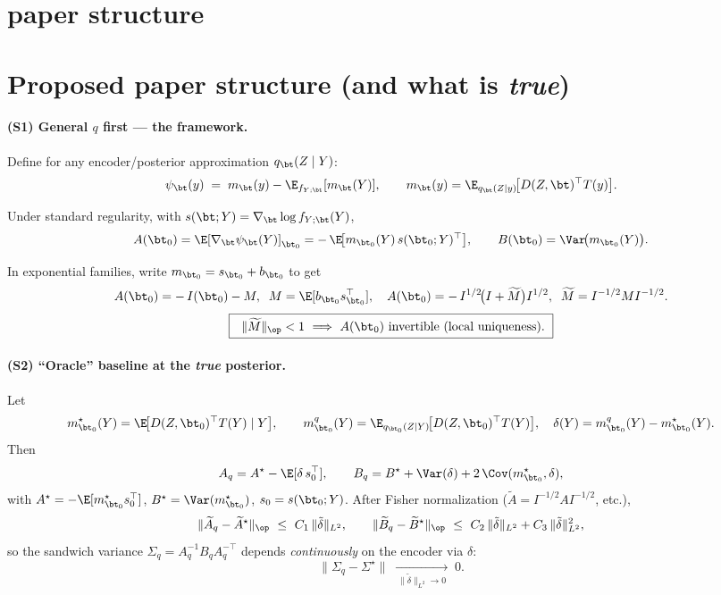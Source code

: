 \section{paper structure}

\section*{Proposed paper structure (and what is \emph{true})}

\paragraph{(S1) General $q$ first — the framework.}
Define for any encoder/posterior approximation $q_\bt(Z\mid Y)$:
\[
\psi_\bt(y)\;=\;m_\bt(y)-\E_{f_{Y;\bt}}[m_\bt(Y)],\qquad
m_\bt(y)=\E_{q_\bt(Z\mid y)}\!\big[D(Z,\bt)^\top T(y)\big].
\]
\begin{lemma}
Under standard regularity, with $s(\bt;Y)=\nabla_\bt\log f_{Y;\bt}(Y)$,
\[
A(\bt_0)=\E[\nabla_\bt\psi_\bt(Y)]_{\bt_0}
= -\,\E\!\big[m_{\bt_0}(Y)\,s(\bt_0;Y)^\top\big],
\qquad
B(\bt_0)=\Var\!\big(m_{\bt_0}(Y)\big).
\]
\end{lemma}
In exponential families, write $m_{\bt_0}=s_{\bt_0}+b_{\bt_0}$ to get
\[
A(\bt_0)=-\,I(\bt_0)-M,\;\;M=\E[b_{\bt_0}s_{\bt_0}^\top],\quad
A(\bt_0)=-\,I^{1/2}\!\big(I+\widetilde M\big)I^{1/2},\;\;\widetilde M=I^{-1/2}MI^{-1/2}.
\]
\[
\boxed{\ \ \|\widetilde M\|_{\op}<1\ \Longrightarrow\ A(\bt_0)\ \text{invertible (local uniqueness).}\ }
\]

\paragraph{(S2) “Oracle” baseline at the \emph{true} posterior.}
Let
\[
m^\star_{\bt_0}(Y)=\E\!\big[D(Z,\bt_0)^\top T(Y)\mid Y\big],
\qquad
m^q_{\bt_0}(Y)=\E_{q_{\bt_0}(Z\mid Y)}\!\big[D(Z,\bt_0)^\top T(Y)\big],
\quad
\delta(Y)=m^q_{\bt_0}(Y)-m^\star_{\bt_0}(Y).
\]
Then
\[
A_q=A^\star-\E[\delta\,s_0^\top],\qquad
B_q=B^\star+\Var(\delta)+2\,\Cov(m^\star_{\bt_0},\delta),
\]
with $A^\star=-\E[m^\star_{\bt_0}s_0^\top]$, $B^\star=\Var(m^\star_{\bt_0})$, $s_0=s(\bt_0;Y)$.
After Fisher normalization ($\widetilde A=I^{-1/2}AI^{-1/2}$, etc.),
\[
\|\widetilde A_q-\widetilde A^\star\|_{\op}\ \le\ C_1\,\|\tilde\delta\|_{L^2},\qquad
\|\widetilde B_q-\widetilde B^\star\|_{\op}\ \le\ C_2\,\|\tilde\delta\|_{L^2}+C_3\,\|\tilde\delta\|_{L^2}^2,
\]
so the sandwich variance $\Sigma_q=A_q^{-1}B_qA_q^{-\top}$ depends \emph{continuously} on the encoder via $\delta$:
\[
\|\Sigma_q-\Sigma^\star\| \;\xrightarrow[\ \|\tilde\delta\|_{L^2}\to 0\ ]{}\;0.
\]

